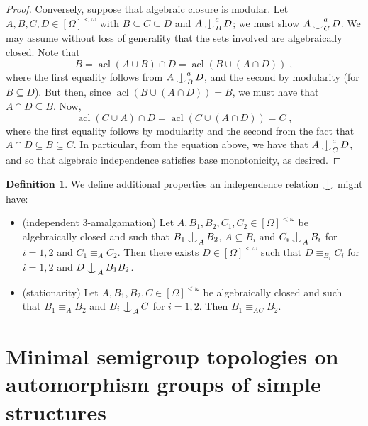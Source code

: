 \documentclass{article}
\theoremstyle{remark}
\theoremstyle{definition}
\newtheorem{definition}[theorem]{Definition}
\DeclareMathOperator{\acl}{acl}
\def\Ind#1#2{#1\setbox0=\hbox{$#1x$}\kern\wd0\hbox to 0pt{\hss$#1\mid$\hss}
	\lower.9\ht0\hbox to 0pt{\hss$#1\smile$\hss}\kern\wd0}
\def\ind{\mathop{\mathpalette\Ind{}}}
\newcommand{\fps}[1]{[#1]^{<\omega}}
\newcommand{\orq}[0]{\equiv}
\begin{document}
{{{{{\begin{proof}
{{Conversely, suppose that algebraic closure is modular. Let
$A,B,C,D\in\fps{\Omega}$ with $B\subseteq C\subseteq D$ and $A\ind^{a}_{B}D$; we must show
$A\ind^{a}_{C}D$.}
We may assume without loss of generality that the sets involved are algebraically closed. Note that
\[B=\acl(A\cup B)\cap D=\acl(B\cup(A\cap D))\;,\]
where the first equality follows from $A\ind^{a}_B D$, and the second by modularity (for $B\subseteq D$). But then, since $\acl(B\cup (A\cap D))=B$, we must have that $A\cap D\subseteq B$. Now, }
\[\acl(C\cup A)\cap D=\acl(C\cup (A\cap D))=C\;,\]
{where the first equality follows by modularity and the second from the fact that $A\cap D\subseteq B\subseteq C$. In particular, from the equation above, we have that $A\ind^{a}_C D$, and so that algebraic independence satisfies base monotonicity, as desired.} 
\end{proof}






















    
 
   \begin{definition}
    \label{d:independence more} We define  additional properties an independence relation $\ind$ might have:
    \begin{itemize}
    \item (independent $3$-amalgamation)  Let   $A,B_{1},B_{2},C_{1},C_{2}\in[\Omega]^{<\omega}$ be algebraically closed and such that $B_{1}\ind_{A}B_{2}$, $A\subseteq B_{i}$ and $C_{i}\ind_{A}B_{i}$ for $i=1,2$ and $C_{1}\orq_{A}C_{2}$. Then there exists $D\in[\Omega]^{<\omega}$ such that
    $D\orq_{B_{i}} C_{i}$ for $i=1,2$ and $D\ind_{A}B_{1}B_{2}$.
    \item (stationarity)
    Let $A, B_1, B_2, C\in[\Omega]^{<\omega}$ be  algebraically closed
    and such that  $B_{1}\orq_{A} B_{2}$ and $B_i\ind_A C$ for $i=1,2$. Then  $B_{1}\orq_{AC} B_{2}$.
    \end{itemize}
    \end{definition}





\section{Minimal semigroup topologies on automorphism groups of simple structures}
 \label{section groups}

}}}}}
\end{document}

